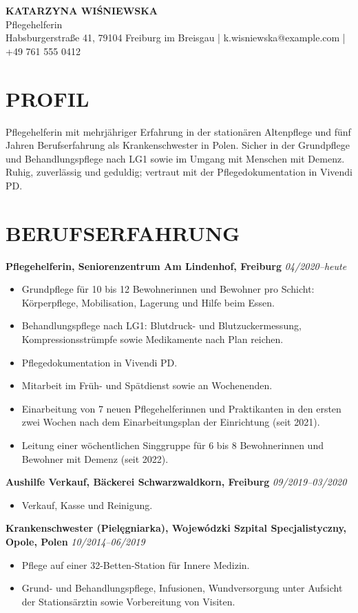 \documentclass[11pt,a4paper]{article}
\begin{document}
\begin{center}
{\Huge\bfseries\color{primarycolor} KATARZYNA WIŚNIEWSKA}\\[0.3em]
{\large Pflegehelferin}\\[0.3em]
Habsburgerstraße 41, 79104 Freiburg im Breisgau | k.wisniewska@example.com | +49 761 555 0412
\end{center}

\section*{PROFIL}
Pflegehelferin mit mehrjähriger Erfahrung in der stationären Altenpflege und fünf Jahren Berufserfahrung als Krankenschwester in Polen. Sicher in der Grundpflege und Behandlungspflege nach LG1 sowie im Umgang mit Menschen mit Demenz. Ruhig, zuverlässig und geduldig; vertraut mit der Pflegedokumentation in Vivendi PD.

\section*{BERUFSERFAHRUNG}
\textbf{Pflegehelferin, Seniorenzentrum Am Lindenhof, Freiburg} \hfill \textit{04/2020–heute}
\begin{itemize}
\item Grundpflege für 10 bis 12 Bewohnerinnen und Bewohner pro Schicht: Körperpflege, Mobilisation, Lagerung und Hilfe beim Essen.
\item Behandlungspflege nach LG1: Blutdruck- und Blutzuckermessung, Kompressionsstrümpfe sowie Medikamente nach Plan reichen.
\item Pflegedokumentation in Vivendi PD.
\item Mitarbeit im Früh- und Spätdienst sowie an Wochenenden.
\item Einarbeitung von 7 neuen Pflegehelferinnen und Praktikanten in den ersten zwei Wochen nach dem Einarbeitungsplan der Einrichtung (seit 2021).
\item Leitung einer wöchentlichen Singgruppe für 6 bis 8 Bewohnerinnen und Bewohner mit Demenz (seit 2022).
\end{itemize}

\textbf{Aushilfe Verkauf, Bäckerei Schwarzwaldkorn, Freiburg} \hfill \textit{09/2019–03/2020}
\begin{itemize}
\item Verkauf, Kasse und Reinigung.
\end{itemize}

\textbf{Krankenschwester (Pielęgniarka), Wojewódzki Szpital Specjalistyczny, Opole, Polen} \hfill \textit{10/2014–06/2019}
\begin{itemize}
\item Pflege auf einer 32-Betten-Station für Innere Medizin.
\item Grund- und Behandlungspflege, Infusionen, Wundversorgung unter Aufsicht der Stationsärztin sowie Vorbereitung von Visiten.
\end{itemize}
\end{document}
